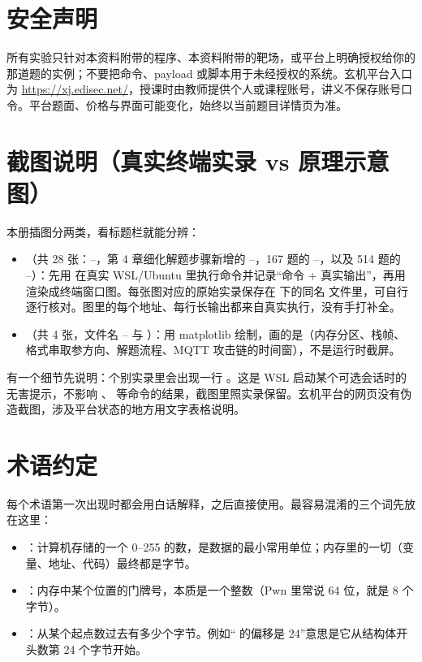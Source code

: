 \documentclass[UTF8,12pt,oneside]{ctexbook}
\begin{document}
\section*{安全声明}
所有实验只针对本资料附带的程序、本资料附带的靶场，或平台上明确授权给你的那道题的实例；不要把命令、payload 或脚本用于未经授权的系统。玄机平台入口为 \url{https://xj.edisec.net/}，授课时由教师提供个人或课程账号，讲义不保存账号口令。平台题面、价格与界面可能变化，始终以当前题目详情页为准。

\section*{截图说明（真实终端实录 vs 原理示意图）}
本册插图分两类，看标题栏就能分辨：
\begin{itemize}
\item {}（共 28 张：--，第 4 章细化解题步骤新增的 --，167 题的 --，以及 514 题的 --）：先用  在真实 WSL/Ubuntu 里执行命令并记录“命令 + 真实输出”，再用  渲染成终端窗口图。每张图对应的原始实录保存在  下的同名  文件里，可自行逐行核对。图里的每个地址、每行长输出都来自真实执行，没有手打补全。
\item {}（共 4 张，文件名 -- 与 ）：用 matplotlib 绘制，画的是（内存分区、栈帧、格式串取参方向、解题流程、MQTT 攻击链的时间窗），不是运行时截屏。
\end{itemize}
有一个细节先说明：个别实录里会出现一行 。这是 WSL 启动某个可选会话时的无害提示，不影响 、 等命令的结果，截图里照实录保留。玄机平台的网页没有伪造截图，涉及平台状态的地方用文字表格说明。

\section*{术语约定}
每个术语第一次出现时都会用白话解释，之后直接使用。最容易混淆的三个词先放在这里：
\begin{itemize}
\item {}：计算机存储的一个 0--255 的数，是数据的最小常用单位；内存里的一切（变量、地址、代码）最终都是字节。
\item {}：内存中某个位置的门牌号，本质是一个整数（Pwn 里常说 64 位，就是 8 个字节）。
\item {}：从某个起点数过去有多少个字节。例如“ 的偏移是 24”意思是它从结构体开头数第 24 个字节开始。
\end{itemize}
\end{document}
